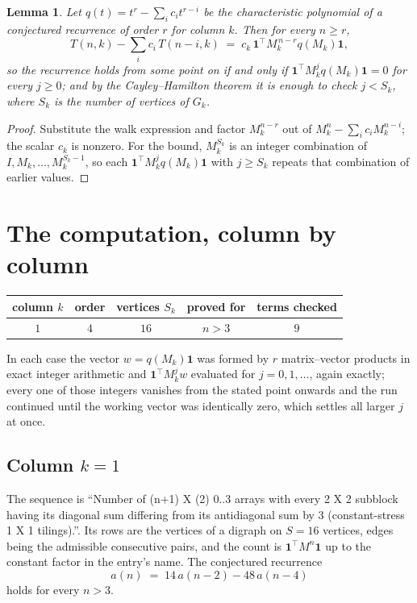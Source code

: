 \documentclass[11pt,a4paper]{article}
\theoremstyle{plain}
\newtheorem{lemma}[theorem]{Lemma}
\theoremstyle{definition}
\begin{document}
\begin{lemma}\label{lem:crit}
Let $q(t)=t^{r}-\sum_i c_it^{r-i}$ be the characteristic polynomial of a conjectured
recurrence of order $r$ for column $k$. Then for every $n\ge r$,
\[
T(n,k)-\sum_i c_i\,T(n-i,k)\;=\;c_k\,\mathbf{1}^{\!\top}M_k^{\,n-r}q(M_k)\mathbf{1},
\]
so the recurrence holds from some point on if and only if
$\mathbf{1}^{\!\top}M_k^{j}q(M_k)\mathbf{1}=0$ for every $j\ge0$; and by the
Cayley--Hamilton theorem it is enough to check $j<S_k$, where $S_k$ is the number of vertices
of $G_k$.
\end{lemma}

\begin{proof}
Substitute the walk expression and factor $M_k^{n-r}$ out of $M_k^{n}-\sum_ic_iM_k^{n-i}$;
the scalar $c_k$ is nonzero. For the bound, $M_k^{S_k}$ is an integer combination of
$I,M_k,\dots,M_k^{S_k-1}$, so each $\mathbf{1}^{\!\top}M_k^{j}q(M_k)\mathbf{1}$ with
$j\ge S_k$ repeats that combination of earlier values.
\end{proof}

\section{The computation, column by column}

\begin{center}
\begin{tabular}{ccccc}
column $k$ & order & vertices $S_k$ & proved for & terms checked \\ \hline
$1$ & $4$ & $16$ & $n>3$ & $9$ \\
\end{tabular}
\end{center}

In each case the vector $w=q(M_k)\mathbf{1}$ was formed by $r$ matrix--vector products in
exact integer arithmetic and $\mathbf{1}^{\!\top}M_k^{j}w$ evaluated for $j=0,1,\dots$,
again exactly; every one of those integers vanishes from the stated point onwards and the run
continued until the working vector was identically zero, which settles all larger $j$ at once.

\subsection*{Column $k=1$}
The sequence is ``Number of (n+1) X (2) 0..3 arrays with every 2 X 2 subblock having its diagonal sum differing from its antidiagonal sum by 3 (constant-stress 1 X 1 tilings).''. Its rows are the vertices of a digraph on
$S=16$ vertices, edges being the admissible consecutive pairs, and the count is
$\mathbf{1}^{\!\top}M^{n}\mathbf{1}$ up to the constant factor in the entry's name.
The conjectured recurrence
\[
a(n)\;=\;14\,a(n-2) - 48\,a(n-4)
\]
holds for every $n>3$.
\end{document}
